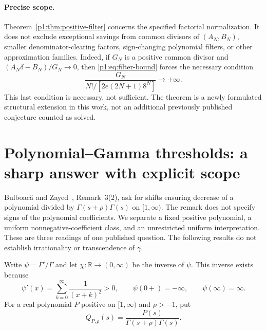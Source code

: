 \documentclass[11pt,a4paper]{article}
\theoremstyle{definition}
\theoremstyle{remark}
\numberwithin{equation}{section}
\begin{document}
\paragraph{Precise scope.}
Theorem~\ref{p1:thm:positive-filter} concerns the specified factorial
normalization. It does not exclude exceptional savings from common
divisors of $(A_N,B_N)$, smaller denominator-clearing factors,
sign-changing polynomial filters, or other approximation families.
Indeed, if $G_N$ is a positive common divisor and
$(A_N\delta-B_N)/G_N\to0$, then \eqref{p1:eq:filter-bound} forces the
necessary condition
\[
 \frac{G_N}{N!/[2e(2N+1)8^N]}\longrightarrow+\infty.
\]
This last condition is necessary, not sufficient. The theorem is a
newly formulated structural extension in this work, not an additional
previously published conjecture counted as solved.


\section{Polynomial--Gamma thresholds: a sharp answer with explicit scope}
\label{p1:sec:gamma-thresholds}

Bulboac\u{a} and Zayed~\cite{p1:bz2026}, Remark~3(2), ask for shifts ensuring decrease of a polynomial divided by $\Gamma(s+\rho)\Gamma(s)$ on $[1,\infty)$. The remark does not specify signs of the polynomial coefficients. We separate a fixed positive polynomial, a uniform nonnegative-coefficient class, and an unrestricted uniform interpretation. These are three readings of one published question. The following results do not establish irrationality or transcendence of $\gamma$.

Write $\psi=\Gamma'/\Gamma$ and let $\chi:\mathbb R\to(0,\infty)$ be the inverse of $\psi$. This inverse exists because
\[
 \psi'(x)=\sum_{k=0}^{\infty}\frac1{(x+k)^2}>0,
 \qquad \psi(0+)=-\infty,\qquad\psi(\infty)=\infty.
\]
For a real polynomial $P$ positive on $[1,\infty)$ and $\rho>-1$, put
\[
 Q_{P,\rho}(s)=\frac{P(s)}{\Gamma(s+\rho)\Gamma(s)}.
\]
\end{document}
